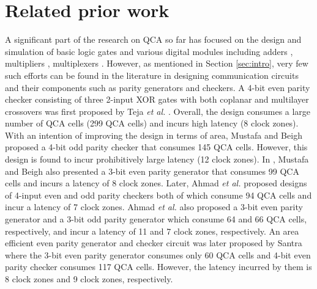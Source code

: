 \documentclass[conference]{IEEEtran}
\begin{document}
\section{Related prior work}
\label{sec:Prior Work}
A significant part of the research on QCA so far has focused on the design and simulation of basic logic gates \cite{lent_jap1994} and various digital modules including adders \cite{zhang_ISCAS2005,DM_d2016}, multipliers \cite{cho_tc2009}, multiplexers \cite{Mardiris_IJCTA_2010}.
However, as mentioned in Section \ref{sec:intro}, very few such efforts can be found in the literature in designing communication circuits and their components such as parity generators and checkers.
A 4-bit even parity checker consisting of three 2-input XOR gates with both coplanar and multilayer crossovers was first proposed by Teja {\it et al.} \cite{teja_nems2008}.
Overall, the design consumes a large number of QCA cells (299 QCA cells) and incurs high latency (8 clock zones).
With an intention of improving the design in terms of area, Mustafa and Beigh \cite{beigh_ijpap2013} proposed a 4-bit odd parity checker that consumes 145 QCA cells.
However, this design is found to incur prohibitively large latency (12 clock zones).
In \cite{beigh_ijpap2013}, Mustafa and Beigh also presented a 3-bit even parity generator that consumes 99 QCA cells and incurs a latency of 8 clock zones.  
Later, Ahmad {\it et al.} \cite{firdous_2015} proposed designs of 4-input even and odd parity checkers both of which consume 94 QCA cells and incur a latency of 7 clock zones.
Ahmad {\it et al.} \cite{firdous_2015} also proposed a 3-bit even parity generator and a 3-bit odd parity generator which consume 64 and 66 QCA cells, respectively, and incur a latency of 11 and 7 clock zones, respectively.
An area efficient even parity generator and checker circuit was later proposed by Santra \cite{S_utpal2014} where the 3-bit even parity generator consumes only 60 QCA cells and 4-bit even parity checker consumes 117 QCA cells. However, the latency incurred by them is 8 clock zones and 9 clock zones, respectively.
\end{document}
